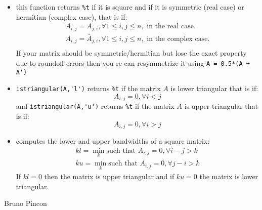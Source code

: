 \begin{mandescription}

\begin{itemize}
\item {} this function returns \verb+%t+ if it 
is square and if it is symmetric (real case) or hermitian (complex case),
that is if:
$$
\begin{array}{l}
   A_{i,j} = A_{j,i}, \forall 1 \le i,j \le n, \mbox{ in the real case.}\\
   A_{i,j} = \bar{A}_{j,i}, \forall 1 \le i,j \le n, \mbox{ in the complex case.}\\
\end{array}
$$
If your matrix should be symmetric/hermitian but lose the exact property due to
roundoff errors then you re can resymmetrize it using \verb-A = 0.5*(A + A')-

\item {} \verb+istriangular(A,'l')+ returns \verb+%t+ if
the matrix $A$ is lower triangular that is if:
$$
   A_{i,j} = 0, \forall i < j
$$ 
and  \verb+istriangular(A,'u')+ returns \verb+%t+ if the matrix $A$ is upper
triangular that is if:
$$
   A_{i,j} = 0, \forall i > j
$$

\item {} computes the lower and upper
  bandwidths of a square matrix:
$$
\begin{array}{l}
    kl = \min_k \mbox{such that } A_{i,j} = 0, \forall i-j > k \\
    ku = \min_k \mbox{such that } A_{i,j} = 0, \forall j-i > k 
\end{array}
$$
If $kl = 0$ then the matrix is upper triangular  and if $ku=0$ the
matrix is lower triangular.
\end{itemize}

\end{mandescription}



\begin{authors}
   Bruno Pincon
\end{authors}
